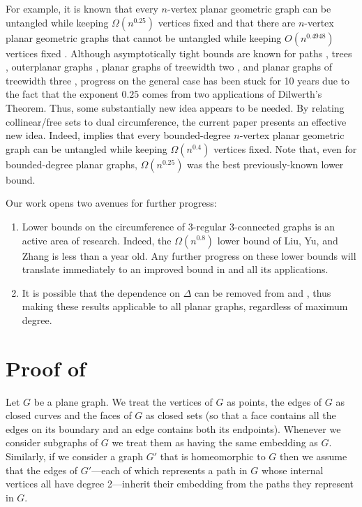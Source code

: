 \documentclass[a4paper,UKenglish]{socg-lipics-v2019}
\begin{document}
For example, it is known that every $n$-vertex planar geometric
graph can be untangled while keeping $\Omega(n^{0.25})$ vertices fixed
\cite{bose.dujmovic.ea:polynomial} and that there are $n$-vertex planar
geometric graphs that cannot be untangled while keeping $O(n^{0.4948})$
vertices fixed \cite{cano.toth.ea:upper}. Although asymptotically
tight bounds are known for paths \cite{cibulka:untangling},
trees \cite{goaoc.kratochvil.ea:untangling}, outerplanar graphs
\cite{goaoc.kratochvil.ea:untangling}, planar graphs of treewidth
two \cite{ravsky.verbitsky:on}, and planar graphs of treewidth three
\cite{dalozzo.dujmovic.ea:drawing}, progress on the general case has
been stuck for 10 years due to the fact that the exponent $0.25$ comes
from two applications of Dilwerth's Theorem.  Thus, some substantially
new idea appears to be needed. By relating collinear/free sets to
dual circumference, the current paper presents an effective new idea.
Indeed,  implies that every bounded-degree $n$-vertex
planar geometric graph can be untangled while keeping $\Omega(n^{0.4})$
vertices fixed.  Note that, even for bounded-degree planar graphs,
$\Omega(n^{0.25})$ was the best previously-known lower bound.

Our work opens two avenues for further progress:

\begin{enumerate}
   \item Lower bounds on the circumference of 3-regular
      3-connected graphs is an active area of research. Indeed,
      the $\Omega(n^{0.8})$ lower bound of Liu, Yu, and Zhang
      \cite{liu.yu.zhang:circumference} is less than a year old.  Any
      further progress on these lower bounds will translate immediately
      to an improved bound in  and all its applications.

   \item It is possible that the dependence on $\Delta$ can be removed
      from  and , thus making these results
      applicable to all planar graphs, regardless of maximum degree.
\end{enumerate}

\section{Proof of }

Let $G$ be a plane graph.  We treat the vertices of $G$ as points,
the edges of $G$ as closed curves and the faces of $G$ as closed sets
(so that a face contains all the edges on its boundary and an edge
contains both its endpoints).  Whenever we consider subgraphs of $G$
we treat them as having the same embedding as $G$.  Similarly, if we
consider a graph $G'$ that is homeomorphic to $G$ then we assume
that the edges of $G'$---each of which represents a path in $G$
whose internal vertices all have degree 2---inherit their embedding from
the paths they represent in $G$.
\end{document}
